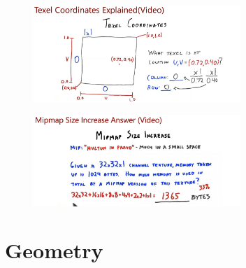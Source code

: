 \documentclass{article}
\begin{document}
\begin{itemize}
 \begin{figure}[H]
    \centering
    \includegraphics[width=0.7\textwidth]{imgs/ex2.png}
\end{figure}

 \begin{figure}[H]
    \centering
    \includegraphics[width=0.7\textwidth]{imgs/ex3.png}
\end{figure}
 
\end{itemize}

\section{Geometry}
\end{document}
